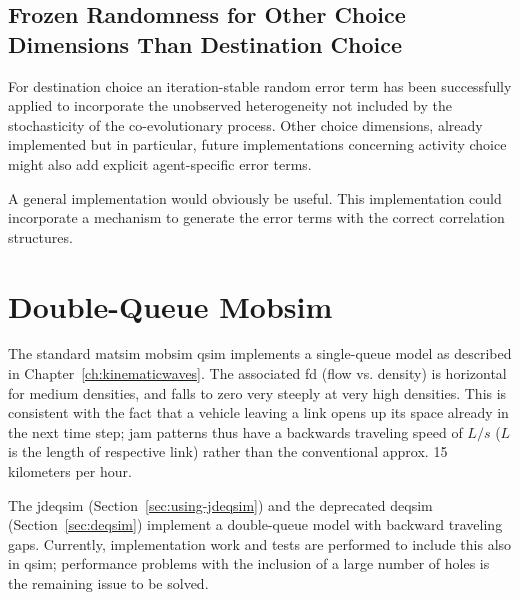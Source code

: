 
\subsection{Frozen Randomness for Other Choice Dimensions Than Destination Choice}
\label{sec:future-frozen-randomness}
For destination choice an iteration-stable random error term has been successfully applied to incorporate the unobserved heterogeneity not included by the stochasticity of the co-evolutionary process. Other choice dimensions, already implemented but in particular, future implementations concerning activity choice might also add explicit agent-specific error terms.  

A general implementation would obviously be useful. 
This implementation could incorporate a mechanism to generate the error terms with the correct correlation structures. 

\section{Double-Queue Mobsim}
\label{sec:researchavenues-double-queue-mobsim}
The standard \gls{matsim} \gls{mobsim} \gls{qsim} implements a single-queue model as described in Chapter~\ref{ch:kinematicwaves}. The associated \gls{fd} (flow vs. density) is horizontal for medium densities, and falls to zero very steeply at very high densities. This is consistent with the fact that a vehicle leaving a link opens up its space already in the next time step; jam patterns thus have a backwards traveling speed of $L/s$ ($L$ is the length of respective link) rather than the conventional approx. 15\,kilometers per hour.

The \gls{jdeqsim} (Section~\ref{sec:using-jdeqsim}) and the deprecated \gls{deqsim} (Section~\ref{sec:deqsim}) implement a double-queue model with backward traveling gaps. Currently, implementation work and tests are performed to include this also in \gls{qsim}; performance problems with the inclusion of a large number of holes is the remaining issue to be solved.

